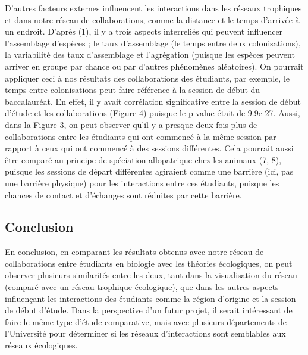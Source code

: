 \documentclass[9pt,twocolumn,twoside,]{pnas-new}
\begin{document}
D'autres facteurs externes influencent les interactions dans les réseaux
trophiques et dans notre réseau de collaborations, comme la distance et
le temps d'arrivée à un endroit. D'après (1), il y a trois aspects
interreliés qui peuvent influencer l'assemblage d'espèces ; le taux
d'assemblage (le temps entre deux colonisations), la variabilité des
taux d'assemblage et l'agrégation (puisque les espèces peuvent arriver
en groupe par chance ou par d'autres phénomènes aléatoires). On pourrait
appliquer ceci à nos résultats des collaborations des étudiants, par
exemple, le temps entre colonisations peut faire référence à la session
de début du baccalauréat. En effet, il y avait corrélation significative
entre la session de début d'étude et les collaborations (Figure 4)
puisque le p-value était de 9.9e-27. Aussi, dans la Figure 3, on peut
observer qu'il y a presque deux fois plus de collaborations entre les
étudiants qui ont commencé à la même session par rapport à ceux qui ont
commencé à des sessions différentes. Cela pourrait aussi être comparé au
principe de spéciation allopatrique chez les animaux (7, 8), puisque les
sessions de départ différentes agiraient comme une barrière (ici, pas
une barrière physique) pour les interactions entre ces étudiants,
puisque les chances de contact et d'échanges sont réduites par cette
barrière.

\hypertarget{conclusion}{%
\subsection{Conclusion}\label{conclusion}}

En conclusion, en comparant les résultats obtenus avec notre réseau de
collaborations entre étudiants en biologie avec les théories
écologiques, on peut observer plusieurs similarités entre les deux, tant
dans la visualisation du réseau (comparé avec un réseau trophique
écologique), que dans les autres aspects influençant les interactions
des étudiants comme la région d'origine et la session de début d'étude.
Dans la perspective d'un futur projet, il serait intéressant de faire le
même type d'étude comparative, mais avec plusieurs départements de
l'Université pour déterminer si les réseaux d'interactions sont
semblables aux réseaux écologiques.
\end{document}
